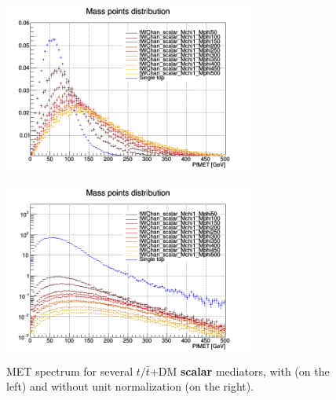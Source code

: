 \documentclass[a4paper, 10pt, openright]{report}
\begin{document}
\begin{figure}[htbp]
\centering
\begin{minipage}[b]{.49\textwidth}
\includegraphics[width=8.2cm, height=6cm]{figs/singleTopScalarMETNorm.png}
\end{minipage}\hfill
\begin{minipage}[b]{.49\textwidth}
\includegraphics[width=8.2cm, height=6cm]{figs/singleTopScalarMET.png}
\end{minipage} \hfill
\caption{\ac{MET} spectrum for several $t/\bar t$+DM \textbf{scalar} mediators, with (on the left) and without unit normalization (on the right).}
\label{fig:signalSingleScalar}
\end{figure}
\end{document}
